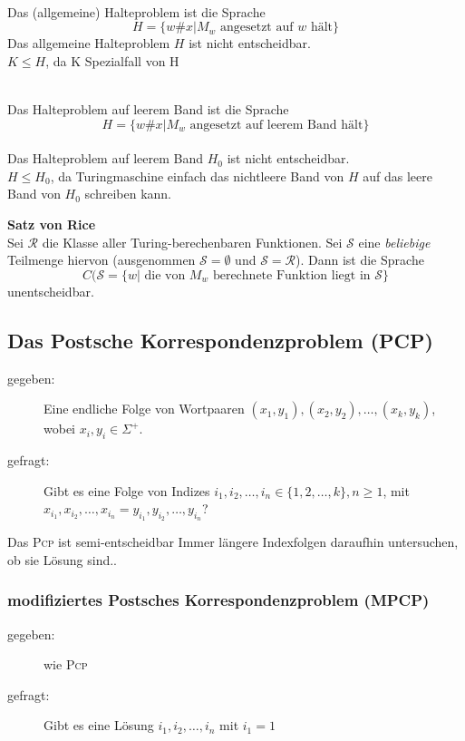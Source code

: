\documentclass{scrartcl}
\begin{document}
\begin{shaded}
    \ \\Das (allgemeine) Halteproblem ist die Sprache \[H=\{w\#x | M_w \textrm{ angesetzt auf } w \textrm{ hält}\} \]
    Das allgemeine Halteproblem $H$ ist nicht entscheidbar.\\
    {\tiny $K\leq H$, da K Spezialfall von H}
\end{shaded}

\begin{shaded}
    \ \\Das Halteproblem auf leerem Band ist die Sprache \[H=\{w\#x | M_w \textrm{ angesetzt auf leerem Band hält}\} \] \\
    Das Halteproblem auf leerem Band $H_0$ ist nicht entscheidbar. \\
    {\tiny $H\leq H_0$, da Turingmaschine einfach das nichtleere Band von $H$ auf das leere Band von $H_0$ schreiben kann.}
\end{shaded}

\begin{shaded}
    \textbf{Satz von Rice}\\
    Sei $\mathcal{R}$ die Klasse aller Turing-berechenbaren Funktionen. Sei $\mathcal{S}$ eine \emph{beliebige} Teilmenge hiervon (ausgenommen $\mathcal{S}=\emptyset$ und $\mathcal{S}=\mathcal{R}$). Dann ist die Sprache \[ C(\mathcal{S} = \{w | \textrm{ die von } M_w \textrm{ berechnete Funktion liegt in } \mathcal{S}\} \] unentscheidbar.
\end{shaded}

\subsection*{Das Postsche Korrespondenzproblem (PCP)}
\begin{description}
    \item[gegeben:] Eine endliche Folge von Wortpaaren $(x_1,y_1), (x_2,y_2),\dots,(x_k,y_k)$, wobei $x_i,y_i\in\Sigma^+$.
    \item[gefragt:] Gibt es eine Folge von Indizes $i_1,i_2,\dots,i_n\in\{1,2,\dots,k\},n\geq1$, mit $x_{i_1},x_{i_2},\dots,x_{i_n} = y_{i_1},y_{i_2},\dots,y_{i_n}$?
\end{description}
Das \textsc{Pcp} ist semi-entscheidbar {\tiny Immer längere Indexfolgen daraufhin untersuchen, ob sie Lösung sind.}.
\subsubsection*{modifiziertes Postsches Korrespondenzproblem (MPCP)}
\begin{description}
    \item[gegeben:] wie \textsc{Pcp}
    \item[gefragt:] Gibt es eine Lösung $i_1,i_2,\dots,i_n$ mit $i_1=1$
\end{description}
\end{document}
